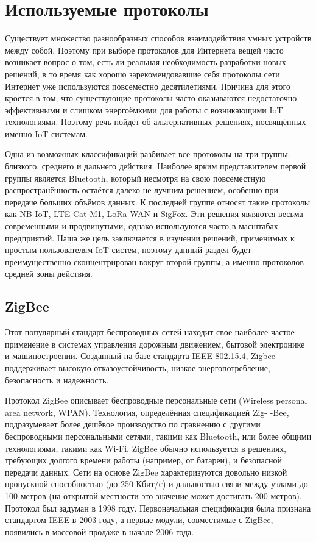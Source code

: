 	
	\section{Используемые протоколы}
	
	Существует множество разнообразных способов взаимодействия умных устройств между собой. Поэтому
	при выборе протоколов для Интернета вещей часто возникает вопрос о том, есть ли реальная необходимость
	разработки новых решений, в то время как хорошо зарекомендовавшие себя протоколы сети Интернет уже
	используются повсеместно десятилетиями. Причина для этого кроется в том, что существующие протоколы
	часто оказываются недостаточно эффективными и слишком энергоёмкими для работы с возникающими
	IoT технологиями. Поэтому речь пойдёт об альтернативных решениях, посвящённых именно IoT системам.
	
	Одна из возможных классификаций разбивает все протоколы на три группы: близкого, среднего и дальнего
	действия. Наиболее ярким представителем первой группы является Bluetooth, который несмотря на свою
	повсеместную распространённость остаётся далеко не лучшим решением, особенно при передаче больших
	объёмов данных. К последней группе относят такие протоколы как NB-IoT, LTE Cat-M1, LoRa WAN и SigFox.
	Эти решения являются весьма современными и продвинутыми, однако используются часто в масштабах
	предприятий. Наша же цель заключается в изучении решений, применимых к простым пользователям 
	IoT систем, поэтому данный раздел будет преимущественно сконцентрирован вокруг второй группы, 
	а именно протоколов средней зоны действия.
	
	
	

	\subsection{ZigBee}
	Этот популярный стандарт беспроводных сетей находит свое наиболее частое применение в системах 
	управления дорожным движением, бытовой электронике и машиностроении. Созданный на базе стандарта
	IEEE 802.15.4, Zigbee поддерживает высокую отказоустойчивость, низкое энергопотребление, безопасность
	и надежность.
	
	Протокол ZigBee описывает беспроводные персональные сети (Wireless personal area network, WPAN).
	Технология, определённая спецификацией Zig- \newline -Bee, подразумевает более дешёвое производство по
	сравнению с другими беспроводными персональными сетями, такими как Bluetooth, или более общими
	технологиями, такими как Wi-Fi. ZigBee обычно используется в решениях, требующих долгого времени
	работы (например, от батареи), и безопасной передачи данных.
	Сети на основе ZigBee характеризуются довольно низкой пропускной способностью (до 250 Кбит/с) и
	дальностью связи между узлами до 100 метров (на открытой местности это значение может достигать
	200 метров). Протокол был задуман в 1998 году. Первоначальная спецификация была признана стандартом 
	IEEE в 2003 году, а первые модули, совместимые с ZigBee, появились в массовой продаже в начале 2006 года.
	
